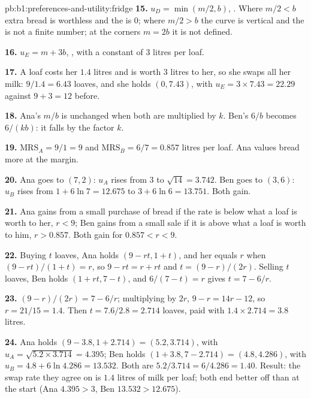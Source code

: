 \begin{solution}{pb:b1:preferences-and-utility:fridge}
\textbf{15.} $u_D = \min(m/2, b)$, . Where $m/2 < b$ extra
bread is worthless and the  is 0; where $m/2 > b$ the curve is vertical and
the  is not a finite number; at the corners $m = 2b$ it is not defined.

\textbf{16.} $u_E = m + 3b$, , with a constant  of 3
litres per loaf.

\textbf{17.} A loaf costs her $1.4$ litres and is worth 3 litres to her, so
she swaps all her milk: $9/1.4 = 6.43$ loaves, and she holds $(0, 7.43)$, with
$u_E = 3 \times 7.43 = 22.29$ against $9 + 3 = 12$ before.

\textbf{18.} Ana's  $m/b$ is unchanged when both are multiplied by $k$.
Ben's $6/b$ becomes $6/(kb)$: it falls by the factor $k$.

\textbf{19.} $\mathrm{MRS}_A = 9/1 = 9$ and $\mathrm{MRS}_B = 6/7 = 0.857$
litres per loaf. Ana values bread more at the margin.

\textbf{20.} Ana goes to $(7, 2)$: $u_A$ rises from $3$ to $\sqrt{14} = 3.742$.
Ben goes to $(3, 6)$: $u_B$ rises from $1 + 6\ln 7 = 12.675$ to
$3 + 6\ln 6 = 13.751$. Both gain.

\textbf{21.} Ana gains from a small purchase of bread if the rate is below what
a loaf is worth to her, $r < 9$; Ben gains from a small sale if it is above
what a loaf is worth to him, $r > 0.857$. Both gain for $0.857 < r < 9$.

\textbf{22.} Buying $t$ loaves, Ana holds $(9 - rt, 1 + t)$, and her  equals $r$ when
$(9 - rt)/(1 + t) = r$, so $9 - rt = r + rt$ and $t = (9 - r)/(2r)$. Selling $t$
loaves, Ben holds $(1 + rt, 7 - t)$, and $6/(7 - t) = r$ gives $t = 7 - 6/r$.

\textbf{23.} $(9 - r)/(2r) = 7 - 6/r$; multiplying by $2r$, $9 - r = 14r - 12$,
so $r = 21/15 = 1.4$. Then $t = 7.6/2.8 = 2.714$ loaves, paid with
$1.4 \times 2.714 = 3.8$ litres.

\textbf{24.} Ana holds $(9 - 3.8, 1 + 2.714) = (5.2, 3.714)$, with
$u_A = \sqrt{5.2 \times 3.714} = 4.395$; Ben holds $(1 + 3.8, 7 - 2.714) = (4.8, 4.286)$,
with $u_B = 4.8 + 6\ln 4.286 = 13.532$. Both  are $5.2/3.714 = 6/4.286 = 1.40$.
Result: the swap rate they agree on is $1.4$ litres of milk per loaf; both
end better off than at the start (Ana $4.395 > 3$, Ben $13.532 > 12.675$).
\end{solution}
